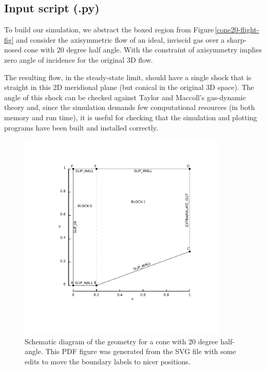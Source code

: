 \subsection{Input script (.py)}
%
To build our simulation, we abstract the boxed region from Figure\,\ref{cone20-flight-fig}
and consider the axisymmetric flow of an ideal, inviscid gas over a sharp-nosed cone 
with 20 degree half angle.
With the constraint of axisymmetry implies zero angle of incidence for the original 3D flow.

\medskip
The resulting flow, in the steady-state limit, should have a single shock that is 
straight in this 2D meridional plane (but conical in the original 3D space).
The angle of this shock can be checked against Taylor and Maccoll's gas-dynamic theory and,
since the simulation demands few computational resources (in both memory and run time), 
it is useful for checking that the simulation and
plotting programs have been built and installed correctly.

\begin{figure}[htbp]
\begin{center}
\includegraphics[width=10cm, viewport=76 78 389 398]{../2D/cone20-simple/cone20_svg.pdf}
\end{center}
\caption{Schematic diagram of the geometry for a cone 
         with 20 degree half-angle.
	 This PDF figure was generated from the SVG file with some edits 
	 to move the boundary labels to nicer positions.}
\label{cone20-geometry-fig}
\end{figure}

